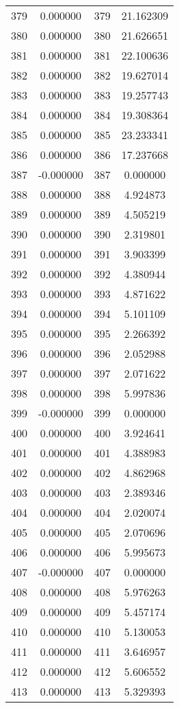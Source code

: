 \documentclass[12pt]{article}
\begin{document}
\begin{longtable}{@{}cccc@{}}
379 & 0.000000 & 379 & 21.162309 \\
380 & 0.000000 & 380 & 21.626651 \\
381 & 0.000000 & 381 & 22.100636 \\
382 & 0.000000 & 382 & 19.627014 \\
383 & 0.000000 & 383 & 19.257743 \\
384 & 0.000000 & 384 & 19.308364 \\
385 & 0.000000 & 385 & 23.233341 \\
386 & 0.000000 & 386 & 17.237668 \\
387 & -0.000000 & 387 & 0.000000 \\
388 & 0.000000 & 388 & 4.924873 \\
389 & 0.000000 & 389 & 4.505219 \\
390 & 0.000000 & 390 & 2.319801 \\
391 & 0.000000 & 391 & 3.903399 \\
392 & 0.000000 & 392 & 4.380944 \\
393 & 0.000000 & 393 & 4.871622 \\
394 & 0.000000 & 394 & 5.101109 \\
395 & 0.000000 & 395 & 2.266392 \\
396 & 0.000000 & 396 & 2.052988 \\
397 & 0.000000 & 397 & 2.071622 \\
398 & 0.000000 & 398 & 5.997836 \\
399 & -0.000000 & 399 & 0.000000 \\
400 & 0.000000 & 400 & 3.924641 \\
401 & 0.000000 & 401 & 4.388983 \\
402 & 0.000000 & 402 & 4.862968 \\
403 & 0.000000 & 403 & 2.389346 \\
404 & 0.000000 & 404 & 2.020074 \\
405 & 0.000000 & 405 & 2.070696 \\
406 & 0.000000 & 406 & 5.995673 \\
407 & -0.000000 & 407 & 0.000000 \\
408 & 0.000000 & 408 & 5.976263 \\
409 & 0.000000 & 409 & 5.457174 \\
410 & 0.000000 & 410 & 5.130053 \\
411 & 0.000000 & 411 & 3.646957 \\
412 & 0.000000 & 412 & 5.606552 \\
413 & 0.000000 & 413 & 5.329393 \\

\end{longtable}
\end{document}
